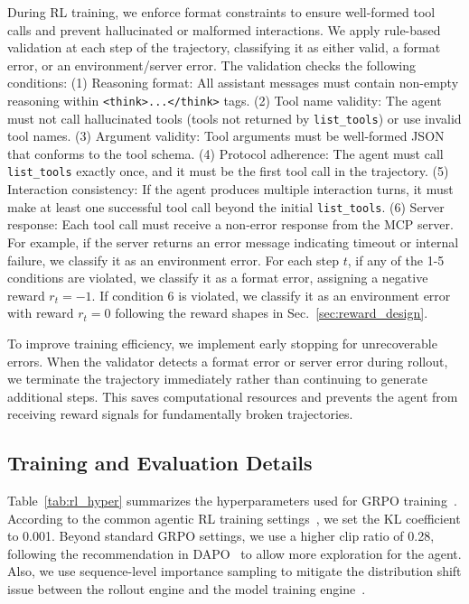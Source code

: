During RL training, we enforce format constraints to ensure well-formed tool calls and prevent hallucinated or malformed interactions.
We apply rule-based validation at each step of the trajectory, classifying it as either valid, a format error, or an environment/server error.
The validation checks the following conditions:
(1) Reasoning format: All assistant messages must contain non-empty reasoning within \texttt{<think>...</think>} tags.
(2) Tool name validity: The agent must not call hallucinated tools (tools not returned by \texttt{list\_tools}) or use invalid tool names.
(3) Argument validity: Tool arguments must be well-formed JSON that conforms to the tool schema.
(4) Protocol adherence: The agent must call \texttt{list\_tools} exactly once, and it must be the first tool call in the trajectory.
(5) Interaction consistency: If the agent produces multiple interaction turns, it must make at least one successful tool call beyond the initial \texttt{list\_tools}.
(6) Server response: Each tool call must receive a non-error response from the MCP server. For example, if the server returns an error message indicating timeout or internal failure, we classify it as an environment error.
For each step $t$, if any of the 1-5 conditions are violated, we classify it as a format error, assigning a negative reward $r_t = -1$. If condition 6 is violated, we classify it as an environment error with reward $r_t = 0$ following the reward shapes in Sec.~\ref{sec:reward_design}. 

To improve training efficiency, we implement early stopping for unrecoverable errors.
When the validator detects a format error or server error during rollout, we terminate the trajectory immediately rather than continuing to generate additional steps.
This saves computational resources and prevents the agent from receiving reward signals for fundamentally broken trajectories. 


\subsection{Training and Evaluation Details} \label{appendix:implementation_details}

Table~\ref{tab:rl_hyper} summarizes the hyperparameters used for GRPO training~\citep{shao2024deepseekmath}.
According to the common agentic RL training settings~\citep{li2025simulatingenvironmentsreasoningmodels,wang2025ragenunderstandingselfevolutionllm}, we set the KL coefficient to 0.001.
Beyond standard GRPO settings, we use a higher clip ratio of 0.28, following the recommendation in DAPO~\citep{dapo} to allow more exploration for the agent.
Also, we use sequence-level importance sampling to mitigate the distribution shift issue between the rollout engine and the model training engine~\citep{yao2025offpolicy}.

